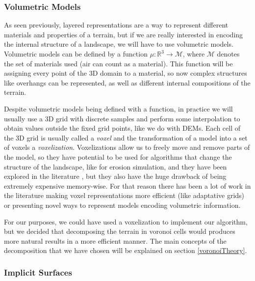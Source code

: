 \subsubsection{Volumetric Models} 

As seen previously, layered representations are a way to represent 
different materials and properties of a terrain, but if we are really 
interested in encoding the internal structure of a landscape, we will 
have to use volumetric models. Volumetric models can be defined by a 
function $\mu: \mathbb{R}^3 \to \mathcal{M}$, where $\mathcal{M}$
denotes the set of materials used (air can count as a material). This 
function will be assigning every point of the 3D domain to a material, so
now complex structures like overhangs can be represented, as well as 
different internal compositions of the terrain.

\vspace{10pt}

Despite volumetric models being defined with a function, in practice we
will usually use a 3D grid with discrete samples and perform some
interpolation to obtain values outside the fixed grid points, like
we do with DEMs. Each cell of the 3D grid is usually called a 
\textit{voxel} and the transformation of a model into a set of voxels a 
\textit{voxelization}. Voxelizations allow us to freely move and remove 
parts of the model, so they have potential to be used for algorithms that
change the structure of the landscape, like for erosion simulation, and 
they have been explored in the literature \cite{wingender2022simulation},
but they also have the huge drawback of being extremely expensive 
memory-wise. For that reason there has been a lot of work in the literature
making voxel representations more efficient (like adaptative grids) or 
presenting novel ways to represent models encoding volumetric information.

\vspace{10pt}

For our purposes, we could have used a voxelization to implement our 
algorithm, but we decided that decomposing the terrain in voronoi cells 
would produces more natural results in a more efficient manner. The main 
concepts of the decomposition that we have chosen will be explained on 
section \ref{voronoiTheory}.

\subsubsection{Implicit Surfaces}

